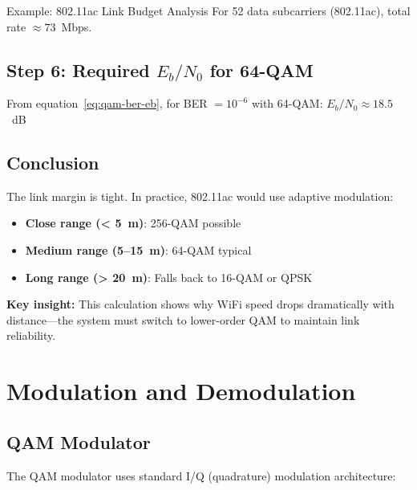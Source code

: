\begin{calloutbox}{Example: 802.11ac Link Budget Analysis}
For 52 data subcarriers (802.11ac), total rate $\approx 73$~Mbps.

\subsection*{Step 6: Required $E_b/N_0$ for 64-QAM}
From equation~\ref{eq:qam-ber-eb}, for BER $= 10^{-6}$ with 64-QAM: $E_b/N_0 \approx 18.5$~dB

\subsection*{Conclusion}
The link margin is tight. In practice, 802.11ac would use adaptive modulation:
\begin{itemize}
\item \textbf{Close range (< 5~m)}: 256-QAM possible
\item \textbf{Medium range (5--15~m)}: 64-QAM typical
\item \textbf{Long range (> 20~m)}: Falls back to 16-QAM or QPSK
\end{itemize}

\textbf{Key insight:} This calculation shows why WiFi speed drops dramatically with distance---the system must switch to lower-order QAM to maintain link reliability.
\end{calloutbox}

\section{Modulation and Demodulation}

\subsection{QAM Modulator}

The QAM modulator uses standard I/Q (quadrature) modulation architecture:


